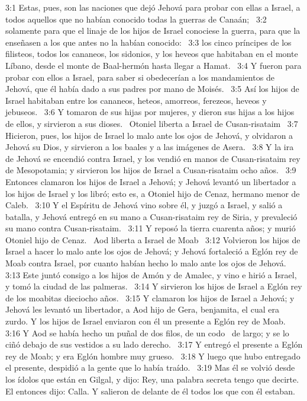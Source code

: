3:1 Estas, pues, son las naciones que dejó Jehová para probar con ellas a Israel, a todos aquellos que no habían conocido todas la guerras de Canaán;  
3:2 solamente para que el linaje de los hijos de Israel conociese la guerra, para que la enseñasen a los que antes no la habían conocido:  
3:3 los cinco príncipes de los filisteos, todos los cananeos, los sidonios, y los heveos que habitaban en el monte Líbano, desde el monte de Baal-hermón hasta llegar a Hamat.  
3:4 Y fueron para probar con ellos a Israel, para saber si obedecerían a los mandamientos de Jehová, que él había dado a sus padres por mano de Moisés.  
3:5 Así los hijos de Israel habitaban entre los cananeos, heteos, amorreos, ferezeos, heveos y jebuseos.  
3:6 Y tomaron de sus hijas por mujeres, y dieron sus hijas a los hijos de ellos, y sirvieron a sus dioses.  
Otoniel liberta a Israel de Cusan-risataim  
3:7 Hicieron, pues, los hijos de Israel lo malo ante los ojos de Jehová, y olvidaron a Jehová su Dios, y sirvieron a los baales y a las imágenes de Asera.  
3:8 Y la ira de Jehová se encendió contra Israel, y los vendió en manos de Cusan-risataim rey de Mesopotamia; y sirvieron los hijos de Israel a Cusan-risataim ocho años.  
3:9 Entonces clamaron los hijos de Israel a Jehová; y Jehová levantó un libertador a los hijos de Israel y los libró; esto es, a Otoniel hijo de Cenaz, hermano menor de Caleb.  
3:10 Y el Espíritu de Jehová vino sobre él, y juzgó a Israel, y salió a batalla, y Jehová entregó en su mano a Cusan-risataim rey de Siria, y prevaleció su mano contra Cusan-risataim.  
3:11 Y reposó la tierra cuarenta años; y murió Otoniel hijo de Cenaz.  
Aod liberta a Israel de Moab  
3:12 Volvieron los hijos de Israel a hacer lo malo ante los ojos de Jehová; y Jehová fortaleció a Eglón rey de Moab contra Israel, por cuanto habían hecho lo malo ante los ojos de Jehová.  
3:13 Este juntó consigo a los hijos de Amón y de Amalec, y vino e hirió a Israel, y tomó la ciudad de las palmeras.  
3:14 Y sirvieron los hijos de Israel a Eglón rey de los moabitas dieciocho años.  
3:15 Y clamaron los hijos de Israel a Jehová; y Jehová les levantó un libertador, a Aod hijo de Gera, benjamita, el cual era zurdo. Y los hijos de Israel enviaron con él un presente a Eglón rey de Moab.  
3:16 Y Aod se había hecho un puñal de dos filos, de un codo  de largo; y se lo ciñó debajo de sus vestidos a su lado derecho.  
3:17 Y entregó el presente a Eglón rey de Moab; y era Eglón hombre muy grueso.  
3:18 Y luego que hubo entregado el presente, despidió a la gente que lo había traído.  
3:19 Mas él se volvió desde los ídolos que están en Gilgal, y dijo: Rey, una palabra secreta tengo que decirte. El entonces dijo: Calla. Y salieron de delante de él todos los que con él estaban.  
